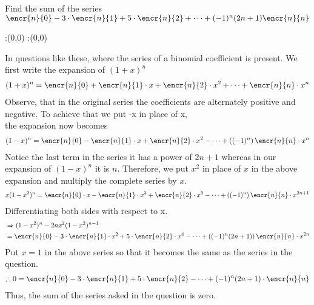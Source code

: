 



\question Find the sum of the series \\ $\encr{n}{0} - 3\cdot \encr{n}{1} +5\cdot \encr{n}{2} + \cdots + (-1)^{n}(2n+1)\encr{n}{n}$



\ifprintanswers
  \begin{marginfigure}
      :(0,0)
      :(0,0)
    \figdrawbegin{}
      \figdrawline [100,101]
    \figdrawend
    \figvisu{\figBoxA}{}{%
    }
    \centerline{\box\figBoxA}
  \end{marginfigure}
\fi 

\begin{solution}
In questions like these, where the series of a binomial coefficient is present. We first write the expansion of $(1+x)^n$  \\
\begin{align}
(1+x)^n = \encr{n}{0} + \encr{n}{1} \cdot x  + \encr{n}{2} \cdot x^2 + \cdots + \encr{n}{n} \cdot x^n  
\end{align} 
Observe, that in the original series the coefficients are alternately positive and negative. To achieve that we put -x in place of x,\\
the expansion now becomes
\begin{align}
(1-x)^n = \encr{n}{0} - \encr{n}{1}\cdot x + \encr{n}{2}\cdot x^2 - \cdots + \left((-1)^{n}\right) \encr{n}{n}\cdot  x^{n}
\end{align}  
Notice the last term in the series it has a power of $2n+1$ whereas in our expansion of $(1-x)^{n}$ it is $n$. Therefore, we put $x^2$ in place of $x$ in the above expansion and multiply the complete series by $x$.
\begin{align}
x(1-x^2)^n =   \encr{n}{0}\cdot x - \encr{n}{1}\cdot x^3  + \encr{n}{2} \cdot x^{5} - \cdots + \left((-1)^{n}\right) \encr{n}{n} \cdot x^{2n+1} 
\end{align}  
Differentiating both sides with respect to x.
\begin{align}
&\Rightarrow (1-x^2)^n-2nx^2(1-x^2)^{n-1} \nonumber \\
&= \encr{n}{0} - 3\cdot \encr{n}{1}\cdot  x^2  + 5\cdot \encr{n}{2}\cdot x^4  - \cdots +  \left((-1)^{n} (2n+1)\right) \encr{n}{n} \cdot  x^{2n} 
\end{align}  
Put $x =1$ in the above series so that it becomes the same as the series in the question.
\begin{align}
\therefore 0 = \encr{n}{0} - 3\cdot \encr{n}{1} + 5\cdot \encr{n}{2} - \cdots + (-1)^{n} (2n+1) \cdot \encr{n}{n} 
\end{align} 
Thus, the sum of the series asked in the question is zero.
\end{solution}


